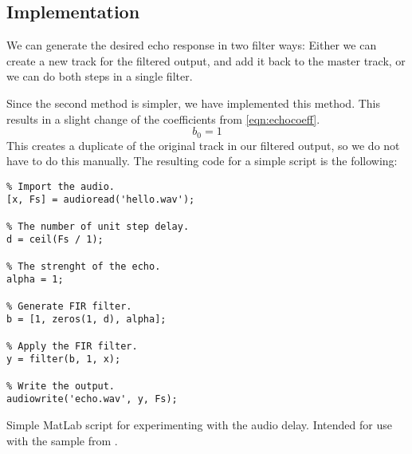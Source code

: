 
\subsection{Implementation}
We can generate the desired echo response in two filter ways: Either we can create a new track for the filtered output, and add it back to the master track, or we can do both steps in a single filter.

Since the second method is simpler, we have implemented this method. This results in a slight change of the coefficients from \cref{eqn:echocoeff}.
\begin{equation}
b_{0} = 1
\end{equation}
This creates a duplicate of the original track in our filtered output, so we do not have to do this manually. The resulting code for a simple script is the following:
\begin{listing}
\begin{verbatim}
% Import the audio.
[x, Fs] = audioread('hello.wav');  

% The number of unit step delay.
d = ceil(Fs / 1);

% The strenght of the echo.
alpha = 1;

% Generate FIR filter.
b = [1, zeros(1, d), alpha];

% Apply the FIR filter.
y = filter(b, 1, x);

% Write the output.
audiowrite('echo.wav', y, Fs);
\end{verbatim}
\caption{Simple MatLab script for experimenting with the audio delay. Intended for use with the sample from \cite{audiohello}.}
\label{lst:echosample}
\end{listing}

